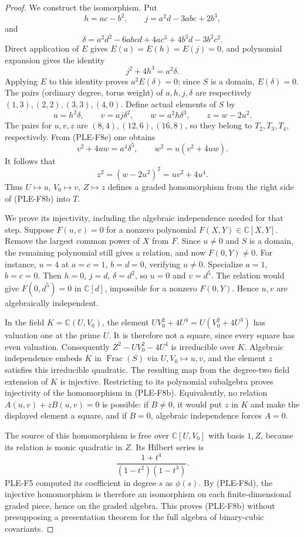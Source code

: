 \begin{proof}
We construct the isomorphism. Put
\[
 h=ac-b^2,\qquad
 j=a^2d-3abc+2b^3,
\]
and
\[
 \delta=a^2d^2-6abcd+4ac^3+4b^3d-3b^2c^2.
\]
Direct application of $E$ gives $E(a)=E(h)=E(j)=0$, and polynomial
expansion gives the identity
\[
 j^2+4h^3=a^2\delta.
 \tag{PLE-F8e}
\]
Applying $E$ to this identity proves $a^2E(\delta)=0$; since
$S$ is a domain, $E(\delta)=0$.
The pairs (ordinary degree, torus weight) of $a,h,j,\delta$ are
respectively $(1,3),(2,2),(3,3),(4,0)$.
Define actual elements of $S$ by
\[
 u=h^2\delta,\qquad
 v=aj\delta^2,\qquad
 w=a^2h\delta^3,\qquad z=w-2u^2.
\]
The pairs for $u,v,z$ are $(8,4),(12,6),(16,8)$, so they belong
to $T_2,T_3,T_4$, respectively. From (PLE-F8e) one obtains
\[
 v^2+4uw=a^4\delta^5,\qquad
 w^2=u(v^2+4uw).
\]
It follows that
\[
 z^2=(w-2u^2)^2=uv^2+4u^4.
 \tag{PLE-F8f}
\]
Thus $U\mapsto u$, $V_0\mapsto v$, $Z\mapsto z$ defines a graded
homomorphism from the right side of (PLE-F8b) into $T$.

We prove its injectivity, including the algebraic independence needed
for that step. Suppose $F(u,v)=0$ for a nonzero polynomial
$F(X,Y)\in\mathbb C[X,Y]$. Remove the largest common power of $X$
from $F$. Since $u\ne0$ and $S$ is a domain, the remaining polynomial
still gives a relation, and now $F(0,Y)\ne0$.
For instance, $u=4$ at $a=c=1$, $b=d=0$, verifying $u\ne0$.
Specialize $a=1$, $b=c=0$. Then $h=0$, $j=d$, $\delta=d^2$,
so $u=0$ and $v=d^5$. The relation would give
$F(0,d^5)=0$ in $\mathbb C[d]$, impossible for a nonzero
$F(0,Y)$. Hence $u,v$ are algebraically independent.

In the field $K=\mathbb C(U,V_0)$, the element
$UV_0^2+4U^4=U(V_0^2+4U^3)$ has valuation one at the prime $U$.
It is therefore not a square, since every square has even valuation.
Consequently $Z^2-UV_0^2-4U^4$ is irreducible over $K$.
Algebraic independence embeds $K$ in $\operatorname{Frac}(S)$ via
$U,V_0\mapsto u,v$, and the element $z$ satisfies this irreducible
quadratic. The resulting map from the degree-two field extension of
$K$ is injective. Restricting to its polynomial subalgebra proves
injectivity of the homomorphism in (PLE-F8b). Equivalently, no
relation $A(u,v)+zB(u,v)=0$ is possible: if $B\ne0$, it would put
$z$ in $K$ and make the displayed element a square, and if $B=0$,
algebraic independence forces $A=0$.

The source of this homomorphism is free over $\mathbb C[U,V_0]$
with basis $1,Z$, because its relation is monic quadratic in $Z$.
Its Hilbert series is
\[
 \frac{1+t^4}{(1-t^2)(1-t^3)}.
\]
PLE-F5 computed its coefficient in degree $s$ as $\phi(s)$.
By (PLE-F8d), the injective homomorphism is therefore an isomorphism
on each finite-dimensional graded piece, hence on the graded algebra.
This proves (PLE-F8b) without presupposing a presentation theorem
for the full algebra of binary-cubic covariants.


\end{proof}
